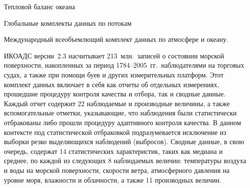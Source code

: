 \begin{chapter}{Тепловой баланс океана}
\begin{section}{Глобальные комплекты данных по потокам}
\begin{paragraph}{Международный всеобъемлющий комплект данных по атмосфере 
и океану.}

ИКОАДС версии~2.3 насчитывает 213~млн.\ записей о состоянии морской 
поверхности, накопленных за период 1784--2005~гг.\ наблюдателями на 
торговых судах, а также при помощи буев и других измерительных платформ. 
Этот комплект данных включает в себя как отчеты об отдельных измерениях, 
прошедшие процедуру контроля качества и отбора, так и сводные
данные. Каждый отчет содержит 22 наблюдаемые и производные величины, 
а также вспомогательные отметки, указывающие, что наблюдения были 
статистически отбракованы либо прошли процедуру адаптивного контроля качества. 
В данном контексте под статистической отбраковкой подразумевается исключение 
из выборки резко выделяющихся наблюдений (выбросов). Сводные данные,
в свою очередь, содержат 14 статистических характеристик, таких как медиана
и среднее, по каждой из следующих 8 наблюдаемых величин: температуры воздуха
и воды на морской поверхности, скорости ветра, атмосферного давления 
на уровне моря, влажности и облачности, а также 11 производных величин.
%


\end{paragraph}
\end{section}
\end{chapter}
